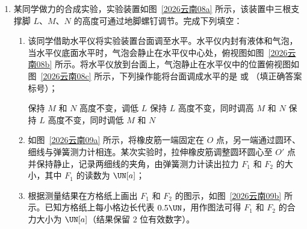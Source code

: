 \documentclass[\gkver]{gaokaozhenti}
\begin{document}
\begin{enumerate}
{故选 AD。
}
\item
某同学做力的合成实验，实验装置如图~\ref{2026云南08a} 所示，该装置中三根支撑脚 $ L $、$ M $、$ N $ 的高度可通过地脚螺钉调节。完成下列填空：
\begin{enumerate}
	\item 
该同学借助水平仪将实验装置台面调至水平。水平仪内封有液体和气泡，当水平仪底面水平时，气泡会静止在水平仪中心处，俯视图如图~\ref{2026云南08b} 所示。将水平仪放到台面上，气泡静止在水平仪中的位置俯视图如图~\ref{2026云南08c} 所示，下列操作能将台面调成水平的是  或 （填正确答案标号）；

{保持 $ M $ 和 $ N $ 高度不变，调低 $ L $}
{保持 $ L $ 高度不变，同时调高 $ M $ 和 $ N $}
{保持 $ L $ 高度不变，同时调低 $ M $ 和 $ N $}


\item
如图~\ref{2026云南09a} 所示，将橡皮筋一端固定在 $ O $ 点，另一端通过圆环、细线与弹簧测力计相连。某次实验时，拉伸橡皮筋调整圆环圆心至 $ O '$ 点并保持静止，记录两细线的夹角，由弹簧测力计读出拉力 $ F_{1} $ 和 $ F_{2} $ 的大小，其中 $ F_{1} $ 的读数为  $\UN[a]$；	



\item
根据测量结果在方格纸上画出 $ F_{1} $ 和 $ F_{2} $ 的图示，如图~\ref{2026云南09b} 所示。已知方格纸上每小格边长代表 $ 0.5 \UN $，用作图法可得 $ F_{1} $ 和 $ F_{2} $ 的合力大小为  $\UN[a]$（结果保留 $ 2 $ 位有效数字）。

\end{enumerate}


\end{enumerate}
\end{document}
